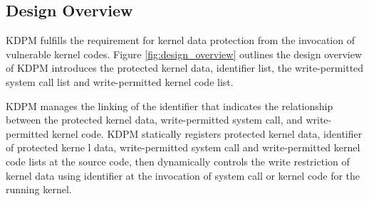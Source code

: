 



\subsection{Design Overview}

KDPM fulfills the requirement for kernel data protection from the invocation of
vulnerable kernel codes. 
%
Figure \ref{fig:design_overview} outlines the design overview of 
%
KDPM introduces the protected kernel data, identifier list, the
write-permitted system call list and write-permitted kernel code list.

%
KDPM manages the linking of the identifier that indicates the relationship between
the protected kernel data, write-permitted system call, and write-permitted kernel
code.
%
KDPM statically registers protected kernel data, identifier of protected kerne
l data, write-permitted system call and write-permitted kernel code lists at the
source code, then dynamically controls the write restriction of kernel data
using identifier at the invocation of system call or kernel code for the running
kernel.

